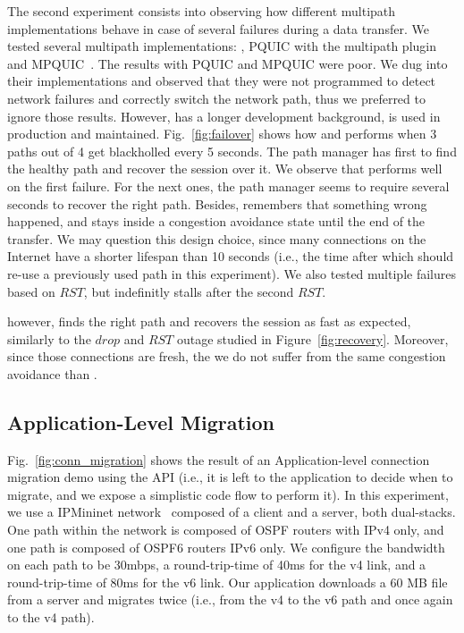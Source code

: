 The second experiment consists into observing how different multipath
implementations behave in case of several failures during a data transfer. We
tested several multipath implementations: \mptcp, PQUIC with the multipath
plugin~\cite{de2019pluginizing} and MPQUIC~\cite{de2017multipath}. The results with PQUIC and MPQUIC were
poor. We dug into their implementations and observed that they were not programmed
to detect network failures and correctly switch the network path, thus we
preferred to ignore those results. However, \mptcp has a longer development
background, is used in production and maintained. Fig.~\ref{fig:failover}
shows how \mptcp and \tcpls performs when 3 paths out of 4 get blackholled every
5 seconds. The path manager has first to find the healthy path and recover the
session over it. We observe that \mptcp performs well on the first
failure. For the next ones, the path manager seems to require several seconds to
recover the right path. Besides, \mptcp remembers that something wrong happened,
and stays inside a congestion avoidance state until the end of the transfer. We
may question this design choice, since many \tcp connections on the Internet have
a shorter lifespan than 10 seconds (i.e., the time after which \mptcp should
re-use a previously used path in this experiment). We also tested multiple
failures based on $RST$, but \mptcp indefinitly stalls after the second $RST$.

\tcpls however, finds the right path and recovers the session as fast as
expected, similarly to the $drop$ and $RST$ outage studied in Figure~\ref{fig:recovery}.
Moreover, since those connections are fresh, the we do not suffer from the same
congestion avoidance than \mptcp.

\subsection{Application-Level Migration}

Fig.~\ref{fig:conn_migration} shows the result of an Application-level
connection migration demo using the API (i.e., it is left to the application to
decide when to migrate, and we expose a simplistic code flow to perform it). In
this experiment, we use a IPMininet network~\cite{ipmininet,
  jadin2020educational} composed of a client and a server, both
dual-stacks. One path within the network is composed of OSPF routers with IPv4
only, and one path is composed of OSPF6 routers IPv6 only. We configure the
bandwidth on each path to be 30mbps, a round-trip-time of 40ms for the v4 link,
and a round-trip-time of 80ms for the v6 link. Our application downloads
a 60 MB file from a server and migrates twice (i.e., from the v4 to the v6 path
and once again to the v4 path).

